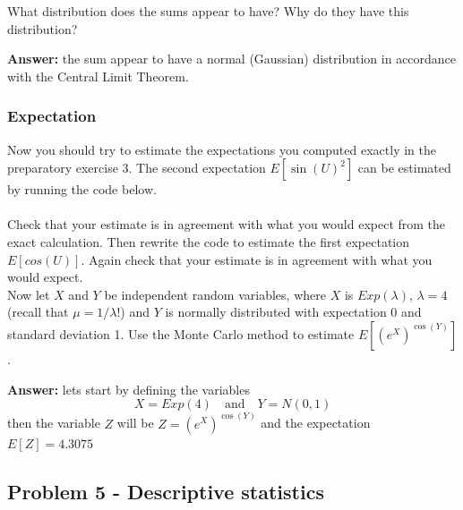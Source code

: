 \documentclass[letterpaper,12pt]{article}
\begin{document}
What distribution does the sums appear to have? Why do they have this distribution?\\
\begin{tcolorbox}
\textbf{Answer:}
the sum appear to have a normal (Gaussian) distribution in accordance with the Central Limit Theorem.
\end{tcolorbox}

\subsubsection*{Expectation}
Now you should try to estimate the expectations you computed exactly in the preparatory exercise 3. The second expectation $E[\sin(U)^{2}]$ can be estimated by running the code below.\\
\\
Check that your estimate is in agreement with what you would expect from the exact calculation. Then rewrite the code to estimate the first expectation $E[cos(U)]$. Again check that your estimate is in agreement with what you would expect.\\
Now let $X$ and $Y$ be independent random variables, where $X$ is $Exp(\lambda)$,
$\lambda = 4$ (recall that $\mu = 1/\lambda$!) and $Y$ is normally distributed with expectation 0 and standard deviation 1. Use the Monte Carlo method to estimate $E[(e^{X})^{\cos(Y)}]$.\\
\begin{tcolorbox}
\textbf{Answer:}
lets start by defining the variables
\begin{equation*}
    X = Exp(4) \quad \text{and} \quad Y = N(0, 1)
\end{equation*}
then the variable $Z$ will be $Z = (e^{X})^{\cos(Y)}$ and the expectation $E[Z] = 4.3075$
\end{tcolorbox}

\subsection*{Problem 5 - Descriptive statistics}
\end{document}

